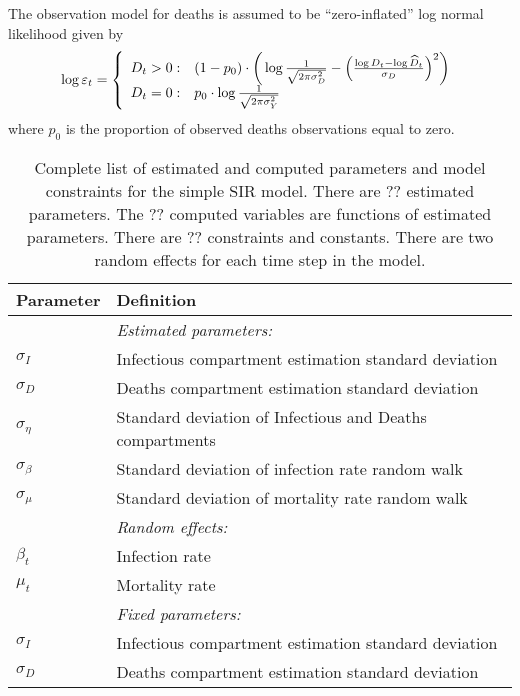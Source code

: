 \documentclass[12pt,letterpaper]{article}
\begin{document}
The observation model for deaths is assumed to be ``zero-inflated''
log normal likelihood given by
\begin{equation}
  \log \varepsilon_t = \left\{
    \begin{array}{r@{\;:\quad}l}
       D_t > 0 &
(1-p_0)\cdot\bigg(\log\frac{1}{\sqrt{2\pi\sigma^2_D}}
          -\Bigl(\frac{\log D_t-\log\widehat{D}_t}{\sigma_D}\Bigr)^2\bigg)\\
       D_t = 0 & p_0 \cdot\log \frac{1}{\sqrt{2\pi\sigma^2_Y}}\\
    \end{array}
  \right.
\end{equation}
where $p_0$ is the proportion of observed deaths observations equal to zero.

\begin{table}[b]
\caption{Complete list of estimated and computed parameters and model
constraints for the simple SIR model.
There are ?? estimated parameters. 
The ?? computed variables are functions of estimated parameters.
There are ?? constraints and constants.
There are two random effects for each time step in the model.
}
\label{tab:allvars1}
\begin{center}
\begin{tabular}{ll}
\hline
Parameter & Definition\\
\hline
\hline
       & {\it Estimated parameters:}\\
$\sigma_I$ & Infectious compartment estimation standard deviation\\
$\sigma_D$ & Deaths compartment estimation standard deviation\\
$\sigma_\eta$ & Standard deviation of Infectious and Deaths compartments\\
$\sigma_\beta$ & Standard deviation of infection rate random walk\\
$\sigma_\mu$ & Standard deviation of mortality rate random walk\\
       & {\it Random effects:}\\
$\beta_t$ & Infection rate\\
$\mu_t$ & Mortality rate\\
       & {\it Fixed parameters:}\\
$\sigma_I$ & Infectious compartment estimation standard deviation\\
$\sigma_D$ & Deaths compartment estimation standard deviation\\
\hline
\end{tabular}
\end{center}
\end{table}
\end{document}
